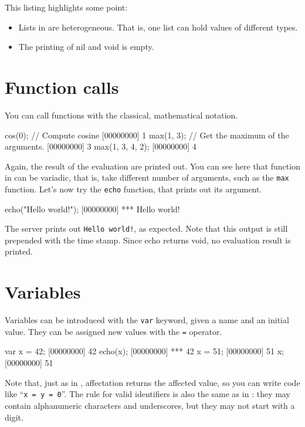 This listing highlights some point:
\begin{itemize}
\item Lists in \us are heterogeneous. That is, one list can hold
  values of different types.
\item The printing of nil and void is empty.
\end{itemize}

\section{Function calls}

You can call functions with the classical, mathematical notation.

\begin{urbiscript}
cos(0); // Compute cosine
[00000000] 1
max(1, 3); // Get the maximum of the arguments.
[00000000] 3
max(1, 3, 4, 2);
[00000000] 4
\end{urbiscript}

Again, the result of the evaluation are printed out. You can see here
that function in \us can be variadic, that is, take different number
of arguments, such as the \lstinline{max} function. Let's now try the
\lstinline{echo} function, that prints out its argument.

\begin{urbiscript}
echo("Hello world!");
[00000000] *** Hello world!
\end{urbiscript}

The server prints out \lstinline{Hello world!}, as expected. Note that
this output is still prepended with the time stamp. Since echo returns
void, no evaluation result is printed.

\section{Variables}
Variables can be introduced with the \lstinline{var} keyword, given a
name and an initial value. They can be assigned new values with the
\lstinline{=} operator.

\begin{urbiscript}
var x = 42;
[00000000] 42
echo(x);
[00000000] *** 42
x = 51;
[00000000] 51
x;
[00000000] 51
\end{urbiscript}

Note that, just as in \Cxx, affectation returns the affected value, so
you can write code like ``\lstinline|x = y = 0|''. The rule for valid
identifiers is also the same as in \Cxx: they may contain alphanumeric
characters and underscores, but they may not start with a digit.

